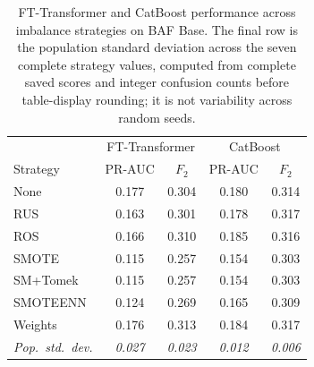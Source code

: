 \begin{table}[H]
\centering
\caption{FT-Transformer and CatBoost performance across imbalance strategies on BAF Base. The final row is the population standard deviation across the seven complete strategy values, computed from complete saved scores and integer confusion counts before table-display rounding; it is not variability across random seeds.}
\label{tab:transformer_robustness_baf}
\begin{tabular}{l cc cc}
\toprule
& \multicolumn{2}{c}{FT-Transformer} & \multicolumn{2}{c}{CatBoost} \\
Strategy & PR-AUC & $F_2$ & PR-AUC & $F_2$ \\
\midrule
None      & 0.177 & 0.304 & 0.180 & 0.314 \\
RUS       & 0.163 & 0.301 & 0.178 & 0.317 \\
ROS       & 0.166 & 0.310 & 0.185 & 0.316 \\
SMOTE     & 0.115 & 0.257 & 0.154 & 0.303 \\
SM+Tomek  & 0.115 & 0.257 & 0.154 & 0.303 \\
SMOTEENN  & 0.124 & 0.269 & 0.165 & 0.309 \\
Weights   & 0.176 & 0.313 & 0.184 & 0.317 \\
\midrule
\textit{Pop.\ std.\ dev.} & \textit{0.027} & \textit{0.023} & \textit{0.012} & \textit{0.006} \\
\bottomrule
\end{tabular}
\end{table}
